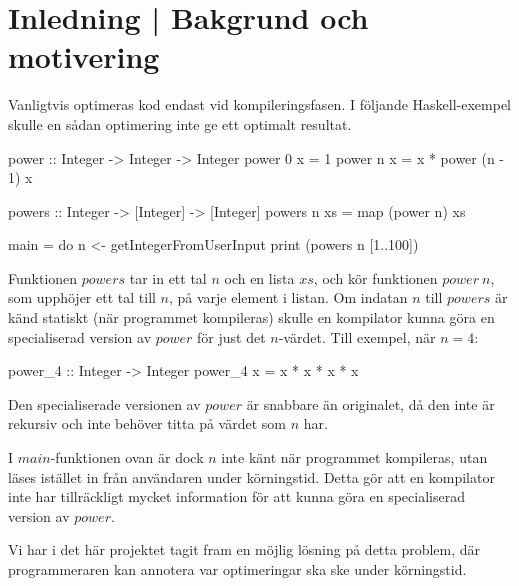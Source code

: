 \documentclass[Rapport]{subfiles}
\begin{document}
\section{Inledning | Bakgrund och motivering}

Vanligtvis optimeras kod endast vid kompileringsfasen. I följande Haskell-exempel 
skulle en sådan optimering inte ge ett optimalt resultat.

\begin{codeEx}
power :: Integer -> Integer -> Integer
power 0 x = 1
power n x = x * power (n - 1) x

powers :: Integer -> [Integer] -> [Integer]
powers n xs = map (power n) xs

main = do
    n <- getIntegerFromUserInput
    print (powers n [1..100])
\end{codeEx}

Funktionen $powers$ tar in ett tal $n$ och en lista $xs$, och kör funktionen $power\:n$, 
som upphöjer ett tal till $n$, på varje element i listan. Om indatan $n$ till 
$powers$ är känd statiskt (när programmet kompileras) skulle en kompilator kunna 
göra en specialiserad version av $power$ för just det $n$-värdet. Till exempel, när $n=4$:

\begin{codeEx}
power_4 :: Integer -> Integer
power_4 x = x * x * x * x
\end{codeEx}

Den specialiserade versionen av $power$ är snabbare än originalet, då den inte är 
rekursiv och inte behöver titta på värdet som $n$ har.

I $main$-funktionen ovan är dock $n$ inte känt när programmet kompileras, utan läses 
istället in från användaren under körningstid. Detta gör att en kompilator inte 
har tillräckligt mycket information för att kunna göra en specialiserad version av $power$.

Vi har i det här projektet tagit fram en möjlig lösning på detta problem, där programmeraren kan 
annotera var optimeringar ska ske under körningstid. 
\end{document}
